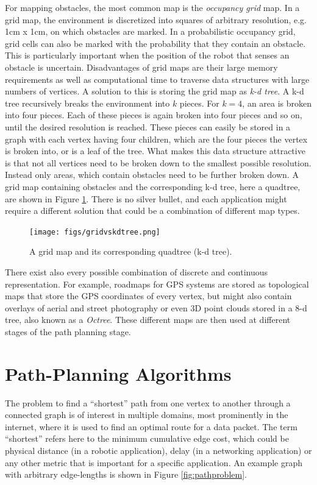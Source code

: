 For mapping obstacles, the most common map is the \emph{occupancy grid} map. In a grid map, the environment is discretized into squares of arbitrary resolution, e.g. 1cm x 1cm, on which obstacles are marked. In a probabilistic occupancy grid, grid cells can also be marked with the probability that they contain an obstacle. This is particularly important when the position of the robot that senses an obstacle is uncertain. Disadvantages of grid maps are their large memory requirements as well as computational time to traverse data structures with large numbers of vertices. A solution to this is storing the grid map as \emph{k-d tree}. A k-d tree recursively breaks the environment into $k$ pieces. For $k=4$, an area is broken into four pieces. Each of these pieces is again broken into four pieces and so on, until the desired resolution is reached. These pieces can easily be stored in a graph with each vertex having four children, which are the four pieces the vertex is broken into, or is a leaf of the tree. What makes this data structure attractive is that not all vertices need to be broken down to the smallest possible resolution. Instead only areas, which contain obstacles need to be further broken down. A grid map containing obstacles and the corresponding k-d tree, here a quadtree, are shown in Figure \ref{fig:gridvskdtree}. There is no silver bullet, and each application might require a different solution that could be a combination of different map types.

\begin{figure}
\centering
\texttt{[image: figs/gridvskdtree.png]}
\caption{A grid map and its corresponding quadtree (k-d tree).\label{fig:gridvskdtree}}
\end{figure}


There exist also every possible combination of discrete and continuous representation. For example, roadmaps for GPS systems are stored as topological maps that store the GPS coordinates of every vertex, but might also contain overlays of aerial and street photography or even 3D point clouds stored in a 8-d tree, also known as a \emph{Octree}. These different maps are then used at different stages of the path planning stage.


\section{Path-Planning Algorithms}
The problem to find a ``shortest'' path from one vertex to another through a connected graph is of interest in multiple domains, most prominently in the internet, where it is used to find an optimal route for a data packet. The term ``shortest'' refers here to the minimum cumulative edge cost, which could be physical distance (in a robotic application), delay (in a networking application) or any other metric that is important for a specific application. An example graph with arbitrary edge-lengths is shown in Figure \ref{fig:pathproblem}.

